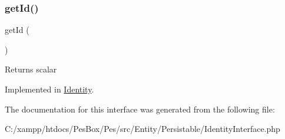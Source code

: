 \subsubsection{\texorpdfstring{get\+Id()}{getId()}}
{\footnotesize\ttfamily get\+Id (\begin{DoxyParamCaption}{ }\end{DoxyParamCaption})}

\begin{DoxyReturn}{Returns}
scalar 
\end{DoxyReturn}


Implemented in \mbox{\hyperlink{class_pes_1_1_entity_1_1_persistable_1_1_identity_a12251d0c022e9e21c137a105ff683f13}{Identity}}.



The documentation for this interface was generated from the following file\+:\begin{DoxyCompactItemize}
\item 
C\+:/xampp/htdocs/\+Pes\+Box/\+Pes/src/\+Entity/\+Persistable/Identity\+Interface.\+php\end{DoxyCompactItemize}
